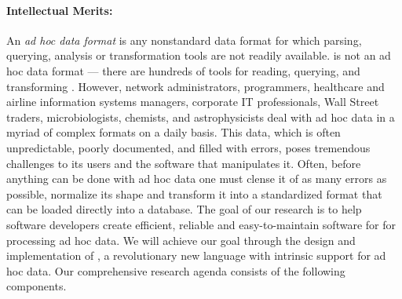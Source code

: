 
\paragraph*{Intellectual Merits:} 
An {\em ad hoc data format} is any nonstandard data format for which
parsing, querying, analysis or transformation tools are not readily
available.  \xml{} is not an ad hoc data format --- there are hundreds
of tools for reading, querying, and transforming \xml{}.   However,
network administrators, programmers,
healthcare and airline information systems managers,
corporate IT professionals, 
Wall Street traders, microbiologists, chemists, and astrophysicists 
deal with ad hoc
data in a myriad of complex formats on a daily basis.
This data, which is often unpredictable, poorly documented, and
filled with errors,
poses tremendous challenges to its users and the software
that manipulates it.  Often, before anything can be done with
ad hoc data one must clense it of as many errors as possible,
normalize its shape and transform it into a standardized format
that can be loaded directly into a database.
The goal of our research is to help software developers 
create efficient, reliable and easy-to-maintain software for
for processing ad hoc data.  We will achieve our goal
through the design and implementation of \datatype,
a revolutionary new language with intrinsic support for 
ad hoc data.  Our comprehensive research agenda
consists of the following components.

